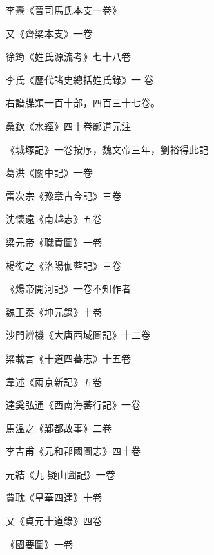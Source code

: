 \begin{pinyinscope}
 李燾《晉司馬氏本支一卷》



 又《齊梁本支》一卷



 徐筠《姓氏源流考》七十八卷



 李氏《歷代諸史總括姓氏錄》一
 卷



 右譜牒類一百十部，四百三十七卷。



 桑欽《水經》四十卷酈道元注



 《城塚記》一卷按序，魏文帝三年，劉裕得此記



 葛洪《關中記》一卷



 雷次宗《豫章古今記》三卷



 沈懷遠《南越志》五卷



 梁元帝《職貢圖》一卷



 楊衒之《洛陽伽藍記》三卷



 《煬帝開河記》一卷不知作者



 魏王泰《坤元錄》十卷



 沙門辨機《大唐西域圖記》十二卷



 梁載言《十道四蕃志》十五卷



 韋述《兩京新記》五卷



 達奚弘通《西南海蕃行記》一卷



 馬溫之《鄴都故事》二卷



 李吉甫《元和郡國圖志》四十卷



 元結《九
 疑山圖記》一卷



 賈耽《皇華四達》十卷



 又《貞元十道錄》四卷



 《國要圖》一卷




\end{pinyinscope}
